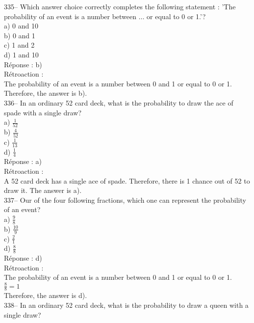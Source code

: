 \documentclass[letterpaper, 12pt]{article}
\begin{document}
335-- Which answer choice correctly completes the following statement : 'The probability of an event is a number between $\ldots$  or equal to 0 or 1.'?\\

a) 0 and 10\\
b) 0 and 1\\
c) 1 and 2\\
d) 1 and 10\\

R\'eponse : b)\\

R\'etroaction : \\
The probability of an event is a number between 0 and 1 or equal to 0 or 1. Therefore, the answer is b).\\

336-- In an ordinary 52 card deck, what is the probability to draw the ace of spade with a single draw?\\

a) $\frac{1}{52}$\\[2mm]
b) $\frac{4}{52}$\\[2mm]
c) $\frac{1}{13}$\\[2mm]
d) $\frac{1}{4}$\\

R\'eponse : a)\\

R\'etroaction : \\
A 52 card deck has a single ace of spade. Therefore, there is 1 chance out of 52 to draw it. The answer is a).\\

337-- Our of the four following fractions, which one can represent the probability of an event?\\

a) $\frac{9}{8}$\\[2mm]
b) $\frac{10}{9}$\\[2mm]
c) $\frac{2}{1}$\\[2mm]
d) $\frac{8}{8}$\\

R\'eponse : d)\\

R\'etroaction : \\
The probability of an event is a number between 0 and 1 or equal to 0 or 1.\\[2mm]
$\frac{8}{8}=1$\\[2mm]
Therefore, the answer is d).\\

338-- In an ordinary 52 card deck, what is the probability to draw a queen with a single draw?\\
\end{document}
